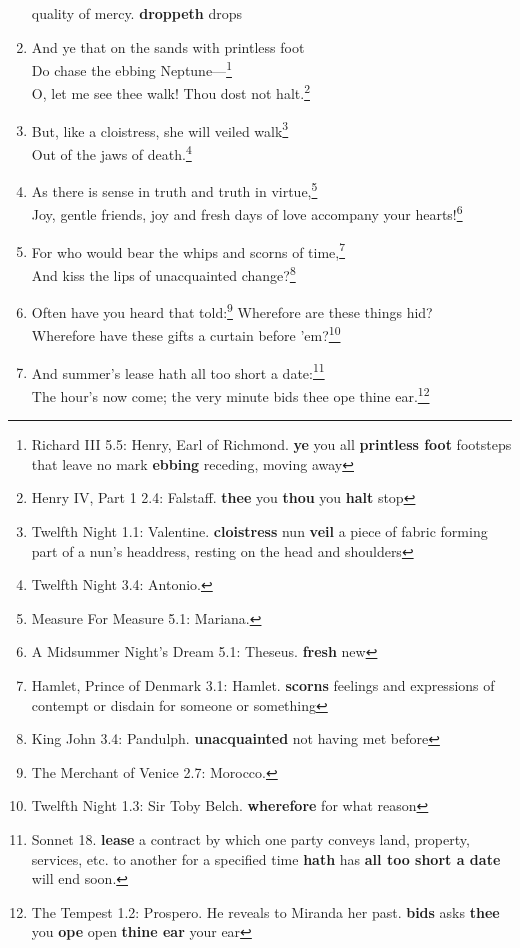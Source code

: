 \documentclass[17pt,twoside]{extarticle}
\begin{document}
\begin{enumerate}
{    quality of mercy. \textbf{droppeth} drops}
\item
  And ye that on the sands with printless foot\\Do chase the ebbing
  Neptune---\footnote{Richard III 5.5: Henry, Earl of Richmond.
    \textbf{ye} you all \textbf{printless foot} footsteps that leave no
    mark \textbf{ebbing} receding, moving away}\\O, let me see thee
  walk! Thou dost not halt.\footnote{Henry IV, Part 1 2.4: Falstaff.
    \textbf{thee} you \textbf{thou} you \textbf{halt} stop}
\item
  But, like a cloistress, she will veiled walk\footnote{Twelfth Night
    1.1: Valentine. \textbf{cloistress} nun \textbf{veil} a piece of
    fabric forming part of a nun's headdress, resting on the head and
    shoulders}\\Out of the jaws of death.\footnote{Twelfth Night 3.4:
    Antonio.}
\item
  As there is sense in truth and truth in virtue,\footnote{Measure For
    Measure 5.1: Mariana.}\\Joy, gentle friends, joy and fresh days of
  love accompany your hearts!\footnote{A Midsummer Night's Dream 5.1:
    Theseus. \textbf{fresh} new}
\item
  For who would bear the whips and scorns of time,\footnote{Hamlet,
    Prince of Denmark 3.1: Hamlet. \textbf{scorns} feelings and
    expressions of contempt or disdain for someone or something}\\And
  kiss the lips of unacquainted change?\footnote{King John 3.4:
    Pandulph. \textbf{unacquainted} not having met before}
\item
  Often have you heard that told:\footnote{The Merchant of Venice 2.7:
    Morocco.} Wherefore are these things hid?\\Wherefore have these
  gifts a curtain before 'em?\footnote{Twelfth Night 1.3: Sir Toby
    Belch. \textbf{wherefore} for what reason}
\item
  And summer's lease hath all too short a date:\footnote{Sonnet 18.
    \textbf{lease} a contract by which one party conveys land, property,
    services, etc. to another for a specified time \textbf{hath} has
    \textbf{all too short a date} will end soon.}\\The hour's now come;
  the very minute bids thee ope thine ear.\footnote{The Tempest 1.2:
    Prospero. He reveals to Miranda her past. \textbf{bids} asks
    \textbf{thee} you \textbf{ope} open \textbf{thine ear} your ear}

\end{enumerate}
\end{document}
